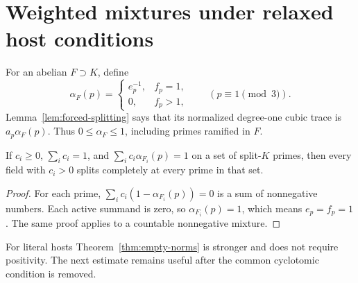 \section{Weighted mixtures under relaxed host conditions}
\label{sec:weighted}

For an abelian $F\supset K$, define
\[
 \alpha_F(p)=
 \begin{cases}e_p^{-1},&f_p=1,\\0,&f_p>1,
 \end{cases}
 \qquad (p\equiv1\pmod3).
                                                        \tag{9.1}
\]
Lemma~\ref{lem:forced-splitting} says that its normalized
degree-one cubic trace is $a_p\alpha_F(p)$. Thus $0\le\alpha_F\le1$,
including primes ramified in $F$.

\begin{proposition}
If $c_i\ge0$, $\sum_i c_i=1$, and
$\sum_i c_i\alpha_{F_i}(p)=1$ on a set of split-$K$ primes,
then every field with $c_i>0$ splits completely at every prime
in that set.
\end{proposition}
\begin{proof}
For each prime, $\sum_i c_i(1-\alpha_{F_i}(p))=0$ is a sum of
nonnegative numbers. Each active summand is zero, so
$\alpha_{F_i}(p)=1$, which means $e_p=f_p=1$.
The same proof applies to a countable nonnegative mixture.
\end{proof}

For literal hosts Theorem~\ref{thm:empty-norms} is stronger and
does not require positivity. The next estimate remains useful
after the common cyclotomic condition is removed.

